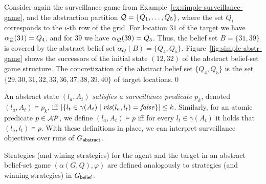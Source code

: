 \begin{example}\label{ex:simple-abstr-game}
Consider again the surveillance game from Example~\ref{ex:simple-surveillance-game}, and the abstraction partition $\mathcal{Q} = \{Q_1,\ldots,Q_5\}$, where the set $Q_i$ corresponds to the $i$-th row of the grid. For location $31$ of the target we have $\alpha_{\mathcal{Q}}(31) = Q_4$, and for  $39$ we have $\alpha_{\mathcal{Q}}(39) = Q_5$. Thus, the belief set $B = \{31,39\}$ is covered by the abstract belief set $\alpha_Q(B) = \{Q_4,Q_5\}$. Figure~\ref{fig:simple-abstr-game} shows the successors of the initial state $(12,32)$ of the abstract belief-set game structure. The concretization of the abstract belief set $\{Q_4,Q_5\}$ is the set $\{29,30,31,32,33,36,37,38,39,40\}$ of target locations.\qed
\end{example}

An abstract state $(l_a,A_t)$ \emph{satisfies a surveillance predicate $p_k$}, denoted $(l_a,A_t) \models p_k$, iff 
$|\{l_t \in \gamma(A_t) \mid \mathit{vis}(l_a,l_t)  = \mathit{false} \}| \leq k$. Similarly, for an atomic predicate $p \in \mathcal{AP}$, we define $(l_a,A_t) \models p$ iff for every $l_t \in \gamma(A_t)$ it holds that $(l_a,l_t) \models p$. With these definitions in place, we can interpret surveillance objectives over runs of $G_{\mathsf{abstract}}$.

Strategies (and wining strategies) for the agent and the target in an abstract belief-set game $(\alpha(G,Q),\varphi)$ are defined analogously to strategies (and winning strategies) in $G_{\mathsf{belief}}$.